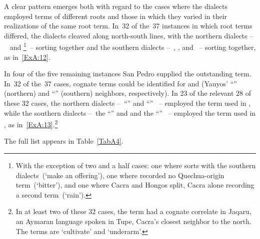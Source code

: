 A clear pattern emerges both with regard to the cases where the dialects employed terms of different roots and those in which they varied in their realizations of the same root term. In~32 of the~37 instances in which root terms differed, the dialects cleaved along north-south lines, with the northern dialects --~\CH{} and \LT\footnote{With the exception of two and a half cases: one where \LT{} sorts with the southern dialects~(‘make an offering’), one where \LT{} recorded no Quechua-origin term~(‘bitter’), and one where Cacra and Hongos split, Cacra alone recording a second term~(‘rain’).}~-- sorting together and the southern dialects --~\MV, \AH, and \SP~-- sorting together, as in~\ref{ExA:12}.

In four of the five remaining instances San Pedro supplied the outstanding term. In~32 of the~37 cases, cognate terms could be identified for  and  (Yauyos’ “\QI” (northern) and “\QII” (southern) neighbors, respectively). In 23 of the relevant 28 of these 32 cases, the northern dialects --~“\QI” \CH{} and “\QII” \LT~-- employed the term used in , while the southern dialects --~the “\QI” \AH{} and \SP{} and the “\QII” \MV~-- employed the term used in , as in~\ref{ExA:13}.\footnote{In at least two of these 32 cases, the  term had a cognate correlate in Jaqaru, an Aymaran language spoken in Tupe, Cacra’s closest neighbor to the north. The terms are  ‘cultivate’ and  ‘underarm’.}

The full list appears in Table~\ref{TabA4}. 
 
